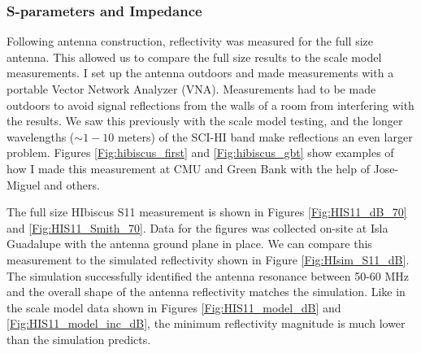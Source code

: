 \subsubsection{S-parameters and Impedance}\label{Sec:HIbiscus_Imp}

Following antenna construction, reflectivity was measured for the full size antenna. This allowed us to compare the full size results to the scale model measurements. I set up the antenna outdoors and made measurements with a portable Vector Network Analyzer (VNA). Measurements had to be made outdoors to avoid signal reflections from the walls of a room from interfering with the results. We saw this previously with the scale model testing, and the longer wavelengths ($\sim 1-10$ meters) of the SCI-HI band make reflections an even larger problem. Figures \ref{Fig:hibiscus_first} and \ref{Fig:hibiscus_gbt} show examples of how I made this measurement at CMU and Green Bank with the help of Jose-Miguel and others.

The full size HIbiscus S11 measurement is shown in Figures \ref{Fig:HIS11_dB_70} and \ref{Fig:HIS11_Smith_70}. Data for the figures was collected on-site at Isla Guadalupe with the antenna ground plane in place. We can compare this measurement to the simulated reflectivity shown in Figure \ref{Fig:HIsim_S11_dB}. The simulation successfully identified the antenna resonance between 50-60 MHz and the overall shape of the antenna reflectivity matches the simulation. Like in the scale model data shown in Figures \ref{Fig:HIS11_model_dB} and \ref{Fig:HIS11_model_inc_dB}, the minimum reflectivity magnitude is much lower than the simulation predicts. 

